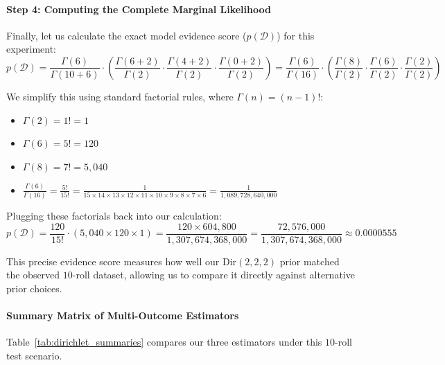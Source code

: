 \documentclass{article}
\begin{document}
\paragraph{Step 4: Computing the Complete Marginal Likelihood}
Finally, let us calculate the exact model evidence score ($p(\mathcal{D})$) for this experiment:
\begin{equation}
p(\mathcal{D}) = \frac{\Gamma(6)}{\Gamma(10 + 6)} \cdot \left( \frac{\Gamma(6+2)}{\Gamma(2)} \cdot \frac{\Gamma(4+2)}{\Gamma(2)} \cdot \frac{\Gamma(0+2)}{\Gamma(2)} \right) = \frac{\Gamma(6)}{\Gamma(16)} \cdot \left( \frac{\Gamma(8)}{\Gamma(2)} \cdot \frac{\Gamma(6)}{\Gamma(2)} \cdot \frac{\Gamma(2)}{\Gamma(2)} \right)
\end{equation}

We simplify this using standard factorial rules, where $\Gamma(n) = (n-1)!$:
\begin{itemize}
    \item $\Gamma(2) = 1! = 1$
    \item $\Gamma(6) = 5! = 120$
    \item $\Gamma(8) = 7! = 5,040$
    \item $\frac{\Gamma(6)}{\Gamma(16)} = \frac{5!}{15!} = \frac{1}{15 \times 14 \times 13 \times 12 \times 11 \times 10 \times 9 \times 8 \times 7 \times 6} = \frac{1}{1,089,728,640,000}$
\end{itemize}

Plugging these factorials back into our calculation:
\begin{equation}
p(\mathcal{D}) = \frac{120}{15!} \cdot \left( 5,040 \times 120 \times 1 \right) = \frac{120 \times 604,800}{1,307,674,368,000} = \frac{72,576,000}{1,307,674,368,000} \approx 0.0000555
\end{equation}

This precise evidence score measures how well our $\text{Dir}(2,2,2)$ prior matched the observed $10$-roll dataset, allowing us to compare it directly against alternative prior choices.

\paragraph{Summary Matrix of Multi-Outcome Estimators}
Table~\ref{tab:dirichlet_summaries} compares our three estimators under this $10$-roll test scenario.
\end{document}
